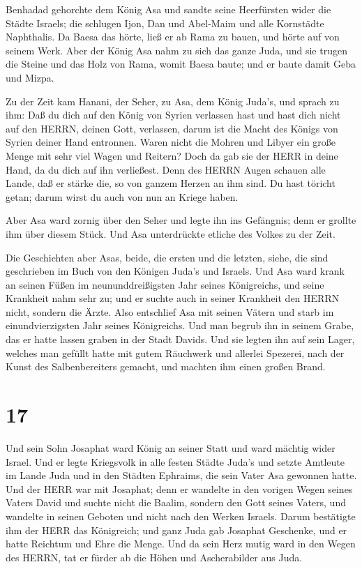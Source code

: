  Benhadad gehorchte dem König Asa und sandte seine
Heerfürsten wider die Städte Israels; die schlugen Ijon, Dan und
Abel-Maim und alle Kornstädte Naphthalis.  Da Baesa das
hörte, ließ er ab Rama zu bauen, und hörte auf von seinem Werk.
 Aber der König Asa nahm zu sich das ganze Juda, und sie
trugen die Steine und das Holz von Rama, womit Baesa baute; und er baute
damit Geba und Mizpa.

 Zu der Zeit kam Hanani, der Seher, zu Asa, dem König
Juda's, und sprach zu ihm: Daß du dich auf den König von Syrien
verlassen hast und hast dich nicht auf den HERRN, deinen Gott,
verlassen, darum ist die Macht des Königs von Syrien deiner Hand
entronnen.  Waren nicht die Mohren und Libyer ein große
Menge mit sehr viel Wagen und Reitern? Doch da gab sie der HERR in deine
Hand, da du dich auf ihn verließest.  Denn des HERRN Augen
schauen alle Lande, daß er stärke die, so von ganzem Herzen an ihm sind.
Du hast töricht getan; darum wirst du auch von nun an Kriege haben.

 Aber Asa ward zornig über den Seher und legte ihn ins
Gefängnis; denn er grollte ihm über diesem Stück. Und Asa unterdrückte
etliche des Volkes zu der Zeit.

 Die Geschichten aber Asas, beide, die ersten und die
letzten, siehe, die sind geschrieben im Buch von den Königen Juda's und
Israels.  Und Asa ward krank an seinen Füßen im
neununddreißigsten Jahr seines Königreichs, und seine Krankheit nahm
sehr zu; und er suchte auch in seiner Krankheit den HERRN nicht, sondern
die Ärzte.  Also entschlief Asa mit seinen Vätern und starb
im einundvierzigsten Jahr seines Königreichs.  Und man
begrub ihn in seinem Grabe, das er hatte lassen graben in der Stadt
Davids. Und sie legten ihn auf sein Lager, welches man gefüllt hatte mit
gutem Räuchwerk und allerlei Spezerei, nach der Kunst des
Salbenbereiters gemacht, und machten ihm einen großen Brand.

\hypertarget{section-16}{%
\section{17}\label{section-16}}

 Und sein Sohn Josaphat ward König an seiner Statt und ward
mächtig wider Israel.  Und er legte Kriegsvolk in alle
festen Städte Juda's und setzte Amtleute im Lande Juda und in den
Städten Ephraims, die sein Vater Asa gewonnen hatte.  Und
der HERR war mit Josaphat; denn er wandelte in den vorigen Wegen seines
Vaters David und suchte nicht die Baalim,  sondern den Gott
seines Vaters, und wandelte in seinen Geboten und nicht nach den Werken
Israels.  Darum bestätigte ihm der HERR das Königreich; und
ganz Juda gab Josaphat Geschenke, und er hatte Reichtum und Ehre die
Menge.  Und da sein Herz mutig ward in den Wegen des HERRN,
tat er fürder ab die Höhen und Ascherabilder aus Juda.

